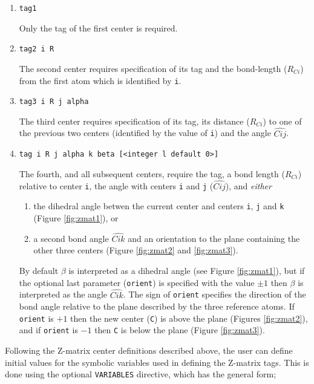 \begin{enumerate}

   \item \verb+tag1+

   Only  the  tag  of the first center is required.

   \item \verb+tag2 i R+

     The second center requires specification of its tag and the
     bond-length ($R_{Ci}$) from the first atom which is identified by
     \verb+i+.

   \item \verb+tag3 i R j alpha+

     The third center requires specification of its tag, its distance
     ($R_{Ci}$) to one of the previous two centers (identified by the
     value of \verb+i+) and the angle $\widehat{Cij}$.

   \item \verb+tag i R j alpha k beta [<integer l default 0>]+

     The fourth, and all subsequent centers, require the tag, a bond
     length ($R_{Ci}$) relative to center \verb+i+, the angle with
     centers \verb+i+ and \verb+j+ ($\widehat{Cij}$), and {\em either} 
    \begin{enumerate}
    \item the dihedral angle betwen the current center and centers
      \verb+i+, \verb+j+ and \verb+k+ (Figure \ref{fig:zmat1}), or
      \item  a second bond angle $\widehat{Cik}$ and an orientation to 
      the plane containing the other three centers (Figure
      \ref{fig:zmat2} and \ref{fig:zmat3}).
    \end{enumerate}

    By default $\beta$ is interpreted as a dihedral angle (see Figure
    \ref{fig:zmat1}), but if the optional last parameter (\verb+orient+) is
    specified with the value $\pm 1$ then $\beta$ is interpreted as
    the angle $\widehat{Cik}$.  The sign of \verb+orient+ specifies the
    direction of the bond angle relative to the plane described by the
    three reference atoms.  If \verb+orient+ is $+1$ then the new center
    (\verb+C+) is above the plane (Figures \ref{fig:zmat2}), and if
    \verb+orient+ is $-1$ then \verb+C+ is below the plane (Figure
    \ref{fig:zmat3}).
\end{enumerate}

Following the Z-matrix center definitions described above, the user can
 define initial values for the symbolic variables used in defining the
Z-matrix tags.  This is done using the optional  \verb+VARIABLES+ directive,
which has the general form;

